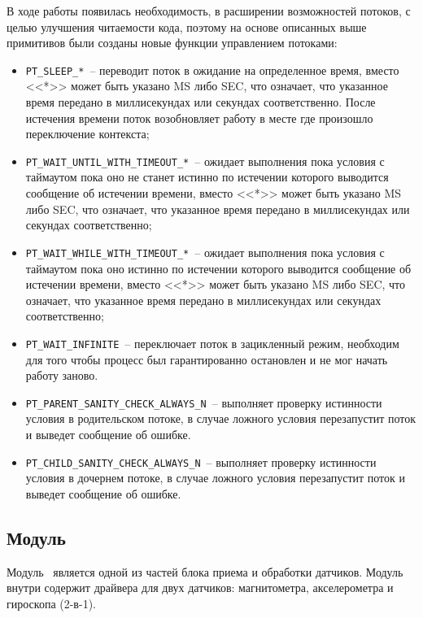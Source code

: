 В ходе работы появилась необходимость, в расширении возможностей потоков, с целью улучшения читаемости кода,
поэтому на основе описанных выше примитивов были созданы новые функции управлением потоками:

\begin{itemize}
    \item \lstinline{PT_SLEEP_*}~-- переводит поток в ожидание на определенное время,
    вместо <<*>> может быть указано MS либо SEC, что означает, что указанное время передано в миллисекундах или секундах соответственно.
    После истечения времени поток возобновляет работу в месте где произошло переключение контекста;
    \item \lstinline{PT_WAIT_UNTIL_WITH_TIMEOUT_*}~-- ожидает выполнения пока условия с таймаутом пока оно не станет истинно
    по истечении которого выводится сообщение об истечении времени, вместо <<*>> может быть указано MS либо SEC,
    что означает, что указанное время передано в миллисекундах или секундах соответственно;
    \item \lstinline{PT_WAIT_WHILE_WITH_TIMEOUT_*}~-- ожидает выполнения пока условия с таймаутом пока оно истинно
    по истечении которого выводится сообщение об истечении времени, вместо <<*>> может быть указано MS либо SEC,
    что означает, что указанное время передано в миллисекундах или секундах соответственно;
    \item \lstinline{PT_WAIT_INFINITE}~-- переключает поток в зацикленный режим, необходим для того чтобы процесс был гарантированно остановлен и не мог начать работу заново.
    \item \lstinline{PT_PARENT_SANITY_CHECK_ALWAYS_N}~-- выполняет проверку истинности условия в родительском потоке,
    в случае ложного условия перезапустит поток и выведет сообщение об ошибке.
    \item \lstinline{PT_CHILD_SANITY_CHECK_ALWAYS_N}~-- выполняет проверку истинности условия в дочернем потоке,
    в случае ложного условия перезапустит поток и выведет сообщение об ошибке.
\end{itemize}


\subsection{Модуль \modulePerifery}
Модуль \modulePerifery\ является одной из частей блока приема и обработки
датчиков. Модуль внутри содержит драйвера для двух датчиков: магнитометра, акселерометра и гироскопа (2-в-1).

